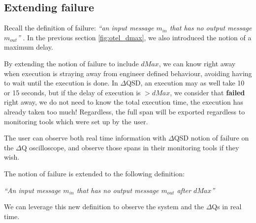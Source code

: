 \subsection{Extending failure}
   Recall the definition of failure: \textit{``an input message $m_{in}$ that has no output message $m_{out}$''} \cite{art}. In the previous section \ref{fig:otel_dmax}, we also introduced the notion of a maximum delay. 

   By extending the notion of failure to include $dMax$, we can know right away when execution is straying away from engineer defined behaviour, avoiding having to wait until the execution is done. In $\Delta$QSD, an execution may as well take 10 or 15 seconds, but if the delay of execution is $> dMax$, we consider that \textbf{failed} right away, we do not need to know the total execution time, the execution has already taken too much! Regardless, the full span will be exported regardless to monitoring tools which were set up by the user. 

   The user can observe both real time information with $\Delta$QSD notion of failure on the $\Delta$Q oscilloscope, and observe those spans in their monitoring tools if they wish.

The notion of failure is extended to the following definition:
        \begin{center}
            \textit{``An input message $m_{in}$ that has no output message $m_{out}$ after $dMax$''} 
        \end{center}
    We can leverage this new definition to observe the system and the $\Delta$Qs in real time.

